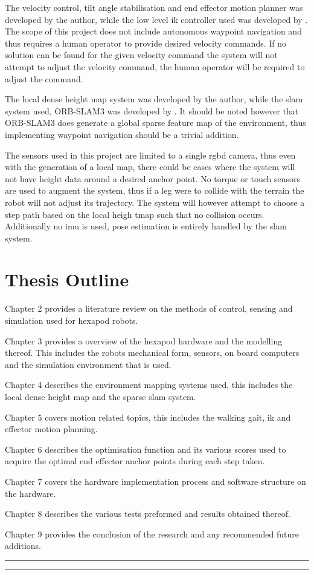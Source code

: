 The velocity control, tilt angle stabilisation and end effector motion planner was developed by the author, while the low level \ac*{ik} controller used was developed
by \citep{erasmus2023guidance}. The scope of this project does not include autonomous waypoint navigation and thus requires a human operator to provide desired velocity
commands. If no solution can be found for the given velocity command the system will not attempt to adjust the velocity command, the human operator will be required to
adjust the command.

The local dense height map system was developed by the author, while the \ac{slam} system used, ORB-SLAM3 was developed by \cite{campos2021orb}.
It should be noted however that ORB-SLAM3 does generate a global sparse feature map of the environment, thus implementing waypoint navigation should be a trivial addition.

The sensors used in this project are limited to a single \ac{rgbd} camera, thus even with the generation of a local map, there could be cases where the system will not have
height data around a desired anchor point. No torque or touch sensors are used to augment the system, thus if a leg were to collide with the terrain the robot will not adjust its trajectory.
The system will however attempt to choose a step path  based on the local heigh tmap such that no collision occurs. Additionally no \ac{imu} is used, pose estimation
is entirely handled by the \ac{slam} system.

\section{Thesis Outline}

Chapter 2 provides a literature review on the methods of control, sensing and simulation used for hexapod robots.

Chapter 3 provides a overview of the hexapod hardware and the modelling thereof. This includes the robots mechanical form, sensors, on board computers and the simulation environment
that is used.

Chapter 4 describes the environment mapping systems used, this includes the local dense height map and the sparse \ac{slam} system.

Chapter 5 covers motion related topics, this includes the walking gait, \ac{ik} and effector motion planning.

Chapter 6 describes the optimisation function and its various scores used to acquire the optimal end effector anchor points during each step taken.

Chapter 7 covers the hardware implementation process and software structure on the hardware.

Chapter 8 describes the various tests preformed and results obtained thereof.

Chapter 9 provides the conclusion of the research and any recommended future additions.


\bigskip
\bigskip
\hrule
\smallbreak
\hrule


